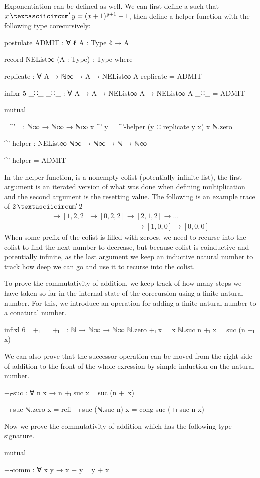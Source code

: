 Exponentiation can be defined as well. We can first define a
 such that $x \mathop{\textasciicircum}' y =
(x+1)^{y+1}-1$, then define a helper function with the following type
corecursively:
\begin{code}[hide]
postulate
  ADMIT : ∀ {ℓ} {A : Type ℓ} → A

record NEList∞ (A : Type) : Type where

replicate : ∀ {A} → ℕ∞ → A → NEList∞ A
replicate = ADMIT

infixr 5 _∷_
_∷_ : ∀ {A} → A → NEList∞ A → NEList∞ A
_∷_ = ADMIT

mutual
\end{code}
\begin{code}
  _^'_ : ℕ∞ → ℕ∞ → ℕ∞
  x ^' y = ^'-helper (y ∷ replicate y x) x ℕ.zero

  ^'-helper : NEList∞ ℕ∞ → ℕ∞ → ℕ → ℕ∞
\end{code}
\begin{code}[hide]
  ^'-helper = ADMIT
\end{code}
In the helper function,  is a nonempty colist (potentially
infinite list), the first argument is an iterated version of what was done when
defining multiplication and the second argument is the resetting value. The
following is an example trace of $2 \mathop{\textasciicircum}' 2$
\begin{gather*}
  [2, 2, 2] \to [1, 2, 2] \to [0, 2, 2] \to [2, 1, 2] \to \dots \\
  \qquad\qquad\qquad\qquad\qquad\qquad\to [1, 0, 0] \to [0, 0, 0]
\end{gather*}
When some prefix of the colist is filled with zeroes, we need to recurse into
the colist to find the next number to decrease, but because colist is
coinductive and potentially infinite, as the last argument we keep an inductive
natural number to track how deep we can go and use it to recurse into the
colist.

To prove the commutativity of addition, we keep track of how many steps we have
taken so far in the internal state of the corecursion using a finite natural
number. For this, we introduce an operation for adding a finite natural number
to a conatural number.
\begin{code}
infixl 6 _+ₗ_
_+ₗ_ : ℕ → ℕ∞ → ℕ∞
ℕ.zero +ₗ x = x
ℕ.suc n +ₗ x = suc (n +ₗ x)
\end{code}
We can also prove that the successor operation can be moved from the right side
of addition to the front of the whole exression by simple induction on the
natural number.
\begin{code}
+ₗ-suc : ∀ n x → n +ₗ suc x ≡ suc (n +ₗ x)
\end{code}
\begin{code}[hide]
+ₗ-suc ℕ.zero x = refl
+ₗ-suc (ℕ.suc n) x = cong suc (+ₗ-suc n x)
\end{code}
Now we prove the commutativity of addition which has the following type
signature.
\begin{code}[hide]
mutual
\end{code}
\begin{code}
  +-comm : ∀ x y → x + y ≡ y + x
\end{code}

